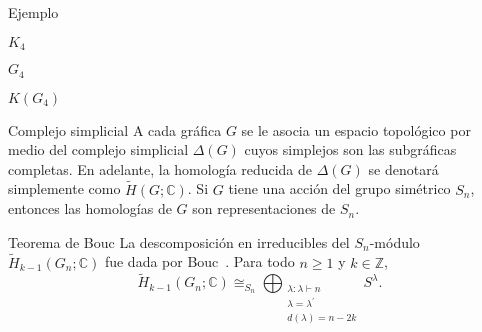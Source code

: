 \documentclass[final,xcolor=svgnames]{beamer}
\begin{document}
\begin{frame}{}
\begin{columns}
\begin{column}{0.5\textwidth}
\begin{block}{Ejemplo}
\begin{minipage}{0.3\linewidth}
          $K_{4}$
        \end{minipage}
        \begin{minipage}{0.3\linewidth}    
          \centering

            $G_{4}$
          \end{minipage}
        \begin{minipage}{0.3\linewidth}    
          \centering

            $K(G_{4})$
                  \end{minipage}
      \end{block}

      \begin{block}{Complejo simplicial}
        A cada gráfica $G$ se le asocia un espacio topológico por
        medio del complejo simplicial $\Delta(G)$ cuyos simplejos son
        las subgráficas completas. En adelante, la homología reducida
        de $\Delta(G)$ se denotará simplemente como $\widetilde
        H(G;\mathbb{C})$. Si $G$ tiene una acción del grupo simétrico
        $S_{n}$, entonces las homologías de $G$ son representaciones
        de $S_{n}$.
      \end{block}

      \begin{block}{Teorema de Bouc}
        La descomposición en irreducibles del $S_{n}$-módulo
        $\widetilde H_{k-1}(G_{n};\mathbb{C})$ fue dada por Bouc~\cite{MR756517}. Para
        todo $n\geq1$ y $k\in \mathbb{Z}$,
          \begin{equation*}
            \widetilde H_{k-1}(G_{n};\mathbb{C})\cong_{S_{n}}\bigoplus_{\substack{\lambda:\lambda\vdash n\\
              \lambda=\lambda^{'}\\d(\lambda)=n-2k}} S^{\lambda}.
          \end{equation*}
       \end{block}
       

\end{column}
\end{columns}
\end{frame}
\end{document}
